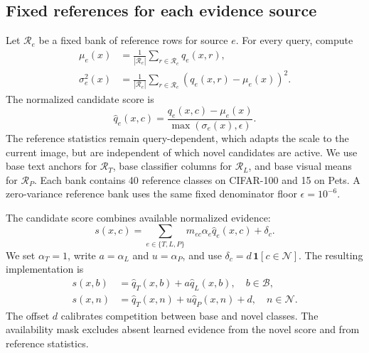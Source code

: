 \documentclass[research]{fcs}
\begin{document}
\subsection{Fixed references for each evidence source}
Let $\mathcal R_e$ be a fixed bank of reference rows for source $e$. For every query, compute
\begin{align}
 \mu_e(x)&=\frac{1}{|\mathcal R_e|}\sum_{r\in\mathcal R_e}q_e(x,r),\\
 \sigma_e^2(x)&=\frac{1}{|\mathcal R_e|}\sum_{r\in\mathcal R_e}(q_e(x,r)-\mu_e(x))^2.
 \label{eq:reference}
\end{align}
The normalized candidate score is
\begin{equation}
 \widehat q_e(x,c)=\frac{q_e(x,c)-\mu_e(x)}{\max(\sigma_e(x),\epsilon)}.
 \label{eq:anchored}
\end{equation}
The reference statistics remain query-dependent, which adapts the scale to the current image, but are independent of which novel candidates are active. We use base text anchors for $\mathcal R_T$, base classifier columns for $\mathcal R_L$, and base visual means for $\mathcal R_P$. Each bank contains 40 reference classes on CIFAR-100 and 15 on Pets. A zero-variance reference bank uses the same fixed denominator floor $\epsilon=10^{-6}$.

The candidate score combines available normalized evidence:
\begin{equation}
 s(x,c)=\sum_{e\in\{T,L,P\}}m_{ec}\alpha_e\widehat q_e(x,c)+\delta_c.
 \label{eq:fusion}
\end{equation}
We set $\alpha_T=1$, write $a=\alpha_L$ and $u=\alpha_P$, and use $\delta_c=d\,\mathbf 1[c\in\mathcal N]$. The resulting implementation is
\begin{align}
 s(x,b)&=\widehat q_T(x,b)+a\widehat q_L(x,b),\quad b\in\mathcal B,\\
 s(x,n)&=\widehat q_T(x,n)+u\widehat q_P(x,n)+d,\quad n\in\mathcal N.
 \label{eq:base-novel}
\end{align}
The offset $d$ calibrates competition between base and novel classes. The availability mask excludes absent learned evidence from the novel score and from reference statistics.
\end{document}
